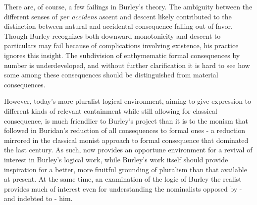 \documentclass[]{birkjour}
\begin{document}
There are, of course, a few failings in Burley's theory. The ambiguity between the different senses of \textit{per accidens} ascent and descent likely contributed to the distinction between natural and accidental consequence falling out of favor. Though Burley recognizes both downward monotonicity and descent to particulars may fail because of complications involving existence, his practice ignores this insight. The subdivision of enthymematic formal consequences by number is underdeveloped, and without further clarification it is hard to see how some among these consequences should be distinguished from material consequences. 

However, today's more pluralist logical environment, aiming to give expression to different kinds of relevant containment while still allowing for classical consequence, is much friendlier to Burley's project than it is to the monism that followed in Buridan's reduction of all consequences to formal ones - a reduction mirrored in the classical monist approach to formal consequence that dominated the last century. As such, now provides an opportune environment for a revival of interest in Burley's logical work, while Burley's work itself should provide inspiration for a better, more fruitful grounding of pluralism than that available at present. At the same time, an examination of the logic of Burley the realist provides much of interest even for understanding the nominalists opposed by - and indebted to - him.
\printbibliography
\end{document}
